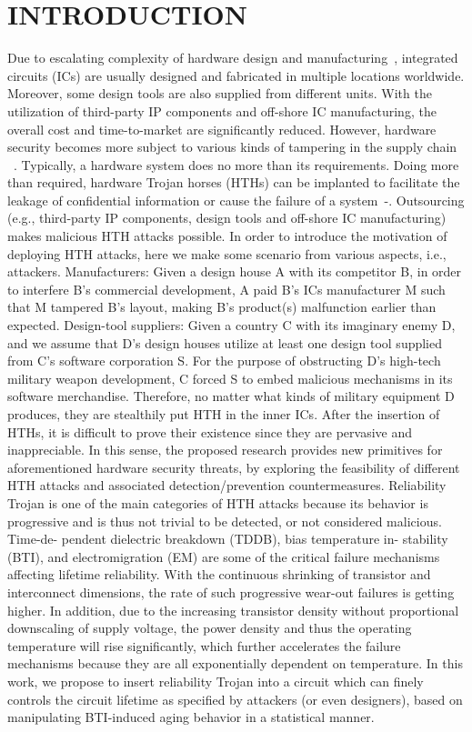 \section{INTRODUCTION}
Due to escalating complexity of hardware design and manufacturing~\cite{wilson2013international}, integrated circuits (ICs) are usually designed and fabricated in multiple locations worldwide. Moreover, some design tools are also supplied from different units. With the utilization of third-party IP components and off-shore IC manufacturing, the overall cost and time-to-market are significantly reduced. However, hardware security becomes more subject to various kinds of tampering in the supply chain ~\cite{tehranipoor2011trustworthy}\cite{karri2010trustworthy}. Typically, a hardware system does no more than its requirements. Doing more than required, hardware Trojan horses (HTHs) can be implanted to facilitate the leakage of confidential information or cause the failure of a system~\cite{adee2008hunt}-\cite{bhunia2014hardware}. Outsourcing (e.g., third-party IP components, design tools and off-shore IC manufacturing) makes malicious HTH attacks possible. In order to introduce the motivation of deploying HTH attacks, here we make some scenario from various aspects, i.e., attackers.
Manufacturers: Given a design house A with its competitor B, in order to interfere B's commercial development, A paid B's ICs manufacturer M such that M tampered B's layout, making B's product(s) malfunction earlier than expected.
Design-tool suppliers: Given a country C with its imaginary enemy D, and we assume that D's design houses utilize at least one design tool supplied from C's software corporation S. For the purpose of obstructing D's high-tech military weapon development, C forced S to embed malicious mechanisms in its software merchandise. Therefore, no matter what kinds of military equipment D produces, they are stealthily put HTH in the inner ICs.
After the insertion of HTHs, it is difficult to prove their existence since they are pervasive and inappreciable. In this sense, the proposed research provides new primitives for aforementioned hardware security threats, by exploring the feasibility of different HTH attacks and associated detection/prevention countermeasures.
Reliability Trojan is one of the main categories of HTH attacks because its behavior is progressive and is thus not trivial to be detected, or not considered malicious. Time-de- pendent dielectric breakdown (TDDB), bias temperature in- stability (BTI), and electromigration (EM) are some of the critical failure mechanisms affecting lifetime reliability. With the continuous shrinking of transistor and interconnect dimensions, the rate of such progressive wear-out failures is getting higher. In addition, due to the increasing transistor density without proportional downscaling of supply voltage, the power density and thus the operating temperature will rise significantly, which further accelerates the failure mechanisms because they are all exponentially dependent on temperature. In this work, we propose to insert reliability Trojan into a circuit which can finely controls the circuit lifetime as specified by attackers (or even designers), based on manipulating BTI-induced aging behavior in a statistical manner.
